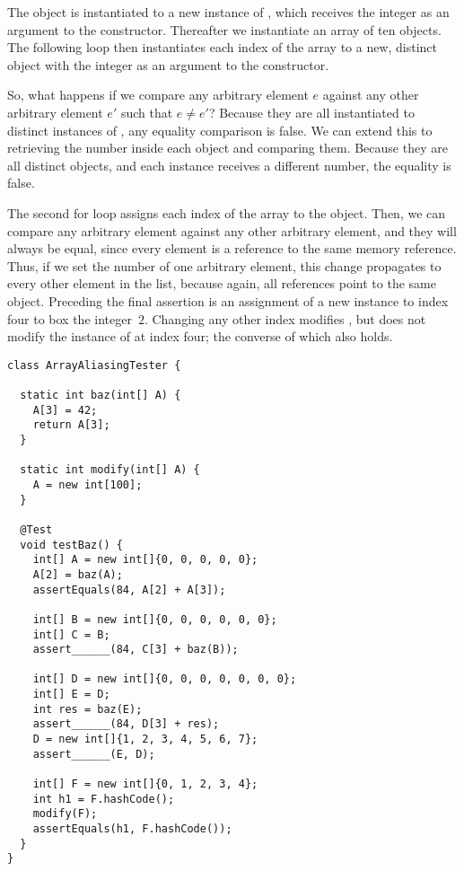 The object  is instantiated to a new instance of , which receives the integer  as an argument to the constructor. Thereafter we instantiate an array of ten  objects. The following loop then instantiates each index of the array to a new, distinct  object with the integer  as an argument to the constructor.

So, what happens if we compare any arbitrary element $e$ against any other arbitrary element $e'$ such that $e \neq e'$? Because they are all instantiated to distinct instances of , any equality comparison is false. We can extend this to retrieving the number inside each  object and comparing them. Because they are all distinct objects, and each  instance receives a different number, the equality is false.

The second for loop assigns each index of the array to the  object. 
Then, we can compare any arbitrary element against any other arbitrary element, and they will always be equal, since every element is a reference to the same memory reference. 
Thus, if we set the number of one arbitrary element, this change propagates to every other element in the list, because again, all references point to the same object.
Preceding the final assertion is an assignment of a new  instance to index four to box the integer~$2$. 
Changing any other index modifies , but does not modify the instance of  at index four; the converse of which also holds.


\begin{lstlisting}[language=MyJava]
class ArrayAliasingTester {

  static int baz(int[] A) {
    A[3] = 42;
    return A[3];
  }

  static int modify(int[] A) {
    A = new int[100];
  }

  @Test
  void testBaz() {
    int[] A = new int[]{0, 0, 0, 0, 0};
    A[2] = baz(A);
    assertEquals(84, A[2] + A[3]);

    int[] B = new int[]{0, 0, 0, 0, 0, 0};
    int[] C = B;
    assert______(84, C[3] + baz(B));

    int[] D = new int[]{0, 0, 0, 0, 0, 0, 0};
    int[] E = D;
    int res = baz(E);
    assert______(84, D[3] + res);  
    D = new int[]{1, 2, 3, 4, 5, 6, 7};
    assert______(E, D);  

    int[] F = new int[]{0, 1, 2, 3, 4};
    int h1 = F.hashCode();
    modify(F);
    assertEquals(h1, F.hashCode());
  }
}
\end{lstlisting}

